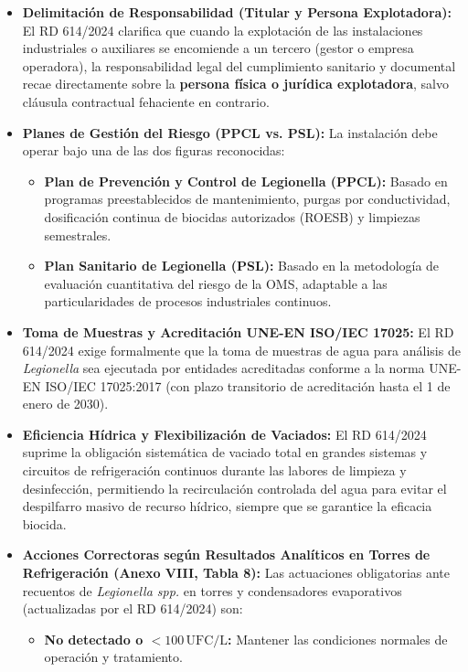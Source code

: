 \documentclass{report}
\begin{document}
\begin{itemize}
    \item \textbf{Delimitación de Responsabilidad (Titular y Persona Explotadora):} El RD 614/2024 clarifica que cuando la explotación de las instalaciones industriales o auxiliares se encomiende a un tercero (gestor o empresa operadora), la responsabilidad legal del cumplimiento sanitario y documental recae directamente sobre la \textbf{persona física o jurídica explotadora}, salvo cláusula contractual fehaciente en contrario.
    \item \textbf{Planes de Gestión del Riesgo (PPCL vs. PSL):} La instalación debe operar bajo una de las dos figuras reconocidas:
    \begin{itemize}
        \item \textbf{Plan de Prevención y Control de Legionella (PPCL):} Basado en programas preestablecidos de mantenimiento, purgas por conductividad, dosificación continua de biocidas autorizados (ROESB) y limpiezas semestrales.
        \item \textbf{Plan Sanitario de Legionella (PSL):} Basado en la metodología de evaluación cuantitativa del riesgo de la OMS, adaptable a las particularidades de procesos industriales continuos.
    \end{itemize}
    \item \textbf{Toma de Muestras y Acreditación UNE-EN ISO/IEC 17025:} El RD 614/2024 exige formalmente que la toma de muestras de agua para análisis de \textit{Legionella} sea ejecutada por entidades acreditadas conforme a la norma UNE-EN ISO/IEC 17025:2017 (con plazo transitorio de acreditación hasta el 1 de enero de 2030).
    \item \textbf{Eficiencia Hídrica y Flexibilización de Vaciados:} El RD 614/2024 suprime la obligación sistemática de vaciado total en grandes sistemas y circuitos de refrigeración continuos durante las labores de limpieza y desinfección, permitiendo la recirculación controlada del agua para evitar el despilfarro masivo de recurso hídrico, siempre que se garantice la eficacia biocida.
    \item \textbf{Acciones Correctoras según Resultados Analíticos en Torres de Refrigeración (Anexo VIII, Tabla 8):} Las actuaciones obligatorias ante recuentos de \textit{Legionella spp.} en torres y condensadores evaporativos (actualizadas por el RD 614/2024) son:
    \begin{itemize}
        \item \textbf{No detectado o $< 100\,\text{UFC/L}$:} Mantener las condiciones normales de operación y tratamiento.

\end{itemize}
\end{itemize}
\end{document}
